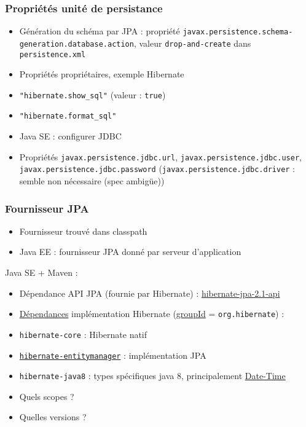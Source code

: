 \documentclass[english, french]{beamer}
\begin{document}
\begin{frame}
	\frametitle{Propriétés unité de persistance}
	\begin{itemize}
		\item Génération du schéma par JPA : propriété {\small\texttt{javax.persistence.schema-generation.database.action}}, valeur {\small\texttt{drop-and-create}} {dans \texttt{persistence.xml}}
		\item Propriétés propriétaires, exemple Hibernate
		\item \texttt{"hibernate.show\_sql"} (valeur : \texttt{true})
		\item \texttt{"hibernate.format\_sql"}
		\item Java SE : configurer JDBC
		\item Propriétés \texttt{javax.persistence.jdbc.url}, \texttt{javax.persistence.jdbc.user}, \texttt{javax.persistence.jdbc.password} {\tiny (\texttt{javax.persistence.jdbc.driver} : semble non nécessaire (spec ambigüe))}
	\end{itemize}
\end{frame}

\begin{frame}
	\frametitle{Fournisseur JPA}
	\begin{itemize}
		\item Fournisseur trouvé dans classpath
		\item Java EE : fournisseur JPA donné par serveur d’application
	\end{itemize}
	Java SE + Maven :
	\begin{itemize}
		\item Dépendance API JPA (fournie par Hibernate) : \href{http://search.maven.org/\#search|gav|1|g\%3A\%22org.hibernate.javax.persistence\%22\%20AND\%20a\%3A\%22hibernate-jpa-2.1-api\%22}{hibernate-jpa-2.1-api}
		\item \href{http://docs.jboss.org/hibernate/orm/5.1/quickstart/html_single/\#_the_hibernate_modules_artifacts}{Dépendances} implémentation Hibernate {\tiny (\href{http://docs.jboss.org/hibernate/orm/5.1/quickstart/html_single/\#_maven_repository_artifacts}{groupId} = \texttt{org.hibernate})} :
		\item \texttt{hibernate-core} : Hibernate natif
		\item \href{http://search.maven.org/\#search|ga|1|g\%3A\%22org.hibernate\%22\%20AND\%20a\%3A\%22hibernate-entitymanager\%22}{\texttt{hibernate-entitymanager}} : implémentation JPA
		\item \texttt{hibernate-java8} : types spécifiques java 8{\tiny, principalement \href{https://docs.oracle.com/javase/tutorial/datetime/}{Date-Time}}
    		\item Quels scopes ?
		\item Quelles versions ?
	\end{itemize}
\end{frame}
\end{document}
